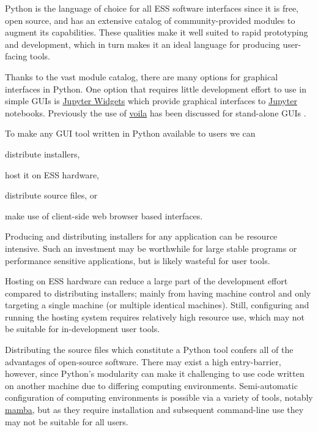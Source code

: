 \documentclass[a4paper, twocolumn, 10pt, revision]{ess}
\begin{document}
Python is the language of choice for all ESS software interfaces since it is free, open source, and has an
extensive catalog of community-provided modules to augment its capabilities.
These qualities make it well suited to rapid prototyping and development,
which in turn makes it an ideal language for producing user-facing tools. %

Thanks to the vast module catalog, there are many options for graphical interfaces in Python.
One option that requires little development effort to use in simple GUIs is
\href{https://ipywidgets.readthedocs.io/}{Jupyter Widgets}
which provide graphical interfaces to
\href{https://jupyter.org/}{Jupyter} notebooks.
Previously the use of \href{https://voila.readthedocs.io/}{voila} has been discussed for stand-alone GUIs \autocite{tucker_spectroscopy_stap_april_2022}.

To make any GUI tool written in Python available to users we can 
\begin{inparaenum}
\item distribute installers,
\item host it on ESS hardware,
\item distribute source files, or
\item make use of client-side web browser based interfaces.
\end{inparaenum}

Producing and distributing installers for any application can be resource intensive.
Such an investment may be worthwhile for large stable programs or performance sensitive applications,
but is likely wasteful for user tools.

Hosting on ESS hardware can reduce a large part of the development effort compared to distributing installers;
mainly from having machine control and only targeting a single machine (or multiple identical machines).
Still, configuring and running the hosting system requires relatively high resource use,
which may not be suitable for in-development user tools.

Distributing the source files which constitute a Python tool confers all of the advantages of open-source software.
There may exist a high entry-barrier, however, since Python's modularity can make it challenging to use code written on another machine due to differing computing environments.
Semi-automatic configuration of computing environments is possible via a variety of tools, notably
\href{https://github.com/conda-forge/miniforge}{mamba},
but as they require installation and subsequent command-line use they may not be suitable for all users.
\end{document}
